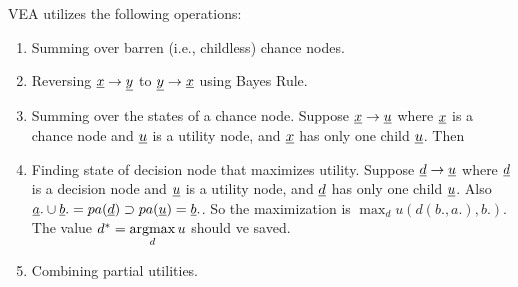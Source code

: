 VEA utilizes the following operations:
\begin{enumerate}
\item Summing over barren (i.e., childless) chance nodes.
\item Reversing ${\underline{x}}\rightarrow {\underline{y}}$
to ${\underline{y}}\rightarrow {\underline{x}}$
using Bayes Rule.
\beq
{}
\eeq

\item Summing over the states of a chance node. Suppose
${\underline{x}}\rightarrow {\underline{u}}$ 
where ${\underline{x}}$ is a chance node and ${\underline{u}}$
is a utility node, and ${\underline{x}}$ has only one child ${\underline{u}}$. Then
\beq
{}
\eeq

\item Finding state of decision node that maximizes utility. 
Suppose ${\underline{d}}\rightarrow {\underline{u}}$ 
where ${\underline{d}}$ is a decision node and ${\underline{u}}$
is a utility node, and ${\underline{d}}$ has only
one child ${\underline{u}}$. Also
${\underline{a}}.\cup{\underline{b}}.=pa({\underline{d}})\supset pa({\underline{u}})={\underline{b}}.$. So the 
maximization is $\max_du (d(b., a.), b.)$.
The value $d^*=\mathop{\mathrm{argmax}}\limits_d u$
should ve saved.

\beq
{}
\eeq

\item Combining partial
utilities. 
\beq
{}
\eeq
\end{enumerate}


